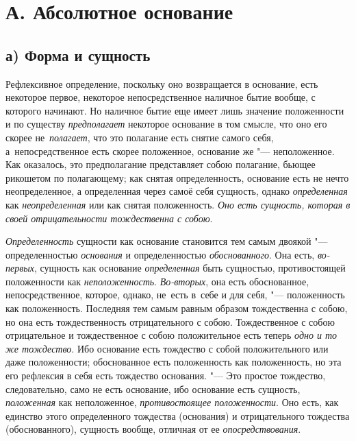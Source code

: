 \section[А. Абсолютное основание]{А. Абсолютное основание}

\subsection[а) Форма и сущность]{а) Форма и сущность}

Рефлексивное определение, поскольку оно возвращается в основание, есть
некоторое первое, некоторое непосредственное наличное бытие вообще, с которого
начинают. Но наличное бытие еще имеет лишь значение положенности и по существу
{\em предполагает} некоторое основание в том смысле, что оно его скорее
не~{\em полагает}, что это полагание есть снятие самого себя,
а~непосредственное есть скорее положенное, основание же "--- неположенное. Как
оказалось, это предполагание представляет собою полагание, бьющее рикошетом по
полагающему; как снятая определенность, основание есть не нечто неопределенное,
а определенная через самоё себя сущность, однако {\em определенная}
как {\em неопределенная} или как снятая положенность.
{\em Оно есть сущность, которая в своей отрицательности тождественна с собою}.

{\em Определенность} сущности как основание становится тем самым двоякой "---
определенностью {\em основания} и определенностью {\em обоснованного}. Она
есть, {\em во-первых}, сущность как основание {\em определенная} быть
сущностью, противостоящей положенности как {\em неположенность}.
{\em Во-вторых}, она есть обоснованное, непосредственное, которое, однако,
не~есть в~себе и для себя, "--- положенность как положенность. Последняя тем
самым равным образом тождественна с собою, но она есть тождественность
отрицательного с собою. Тождественное с собою отрицательное и тождественное с
собою положительное есть теперь {\em одно и то же тождество}. Ибо основание
есть тождество с собой положительного или даже положенности; обоснованное есть
положенность как положенность, но эта его рефлексия в себя есть тождество
основания. "--- Это простое тождество, следовательно, само не есть основание,
ибо основание есть сущность, {\em положенная} как неположенное,
{\em противостоящее положенности}. Оно есть, как единство этого определенного
тождества (основания) и отрицательного тождества (обоснованного), сущность
вообще, отличная от ее {\em опосредствования}.


